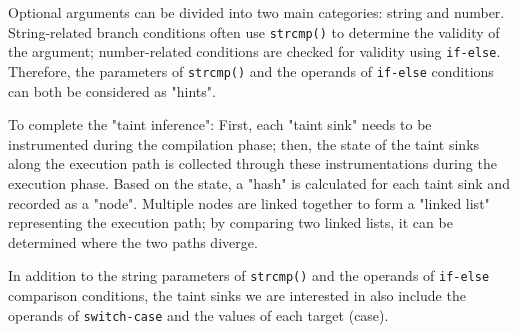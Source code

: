 Optional arguments can be divided into two main categories: string and number. String-related branch conditions often use \texttt{strcmp()} to determine the validity of the argument; number-related conditions are checked for validity using \texttt{if-else}. Therefore, the parameters of \texttt{strcmp()} and the operands of \texttt{if-else} conditions can both be considered as "hints".

To complete the "taint inference": First, each "taint sink" needs to be instrumented during the compilation phase; then, the state of the taint sinks along the execution path is collected through these instrumentations during the execution phase. Based on the state, a "hash" is calculated for each taint sink and recorded as a "node". Multiple nodes are linked together to form a "linked list" representing the execution path; by comparing two linked lists, it can be determined where the two paths diverge.

In addition to the string parameters of \texttt{strcmp()} and the operands of \texttt{if-else} comparison conditions, the taint sinks we are interested in also include the operands of \texttt{switch-case} and the values of each target (case).

